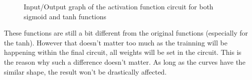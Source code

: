 \begin{figure}[H]
  \centering
  
  \caption{Input/Output graph of the activation function circuit for both sigmoid and \ac{tanh} functions}
  \label{fig:afGraph}
\end{figure}

These functions are still a bit different from the original functions (especially for the \ac{tanh}). However that doesn't matter too much as the trainning will be happening within the final circuit, all weights will be set in the circuit. This is the reason why such a difference doesn't matter. As long as the curves have the similar shape, the result won't be drastically affected.
